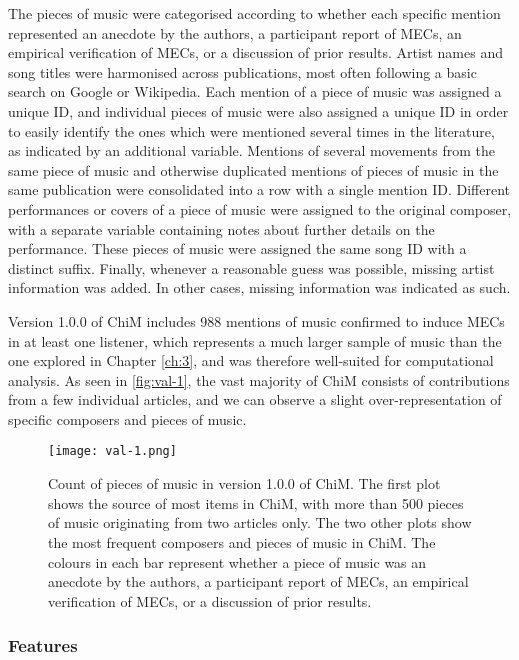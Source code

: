 The pieces of music were categorised according to whether each specific mention represented an anecdote by the authors, a participant report of MECs, an empirical verification of MECs, or a discussion of prior results. Artist names and song titles were harmonised across publications, most often following a basic search on Google or Wikipedia. Each mention of a piece of music was assigned a unique ID, and individual pieces of music were also assigned a unique ID in order to easily identify the ones which were mentioned several times in the literature, as indicated by an additional variable. Mentions of several movements from the same piece of music and otherwise duplicated mentions of pieces of music in the same publication were consolidated into a row with a single mention ID. Different performances or covers of a piece of music were assigned to the original composer, with a separate variable containing notes about further details on the performance. These pieces of music were assigned the same song ID with a distinct suffix. Finally, whenever a reasonable guess was possible, missing artist information was added. In other cases, missing information was indicated as such.

Version 1.0.0 of ChiM includes 988 mentions of music confirmed to induce MECs in at least one listener, which represents a much larger sample of music than the one explored in Chapter \ref{ch:3}, and was therefore well-suited for computational analysis. As seen in \autoref{fig:val-1}, the vast majority of ChiM consists of contributions from a few individual articles, and we can observe a slight over-representation of specific composers and pieces of music.

\begin{figure}[t!]
\texttt{[image: val-1.png]}
\centering
\caption{Count of pieces of music in version 1.0.0 of ChiM. The first plot shows the source of most items in ChiM, with more than 500 pieces of music originating from two articles only. The two other plots show the most frequent composers and pieces of music in ChiM. The colours in each bar represent whether a piece of music was an anecdote by the authors, a participant report of MECs, an empirical verification of MECs, or a discussion of prior results.}
\label{fig:val-1}
\end{figure}

\subsubsection{Features}

